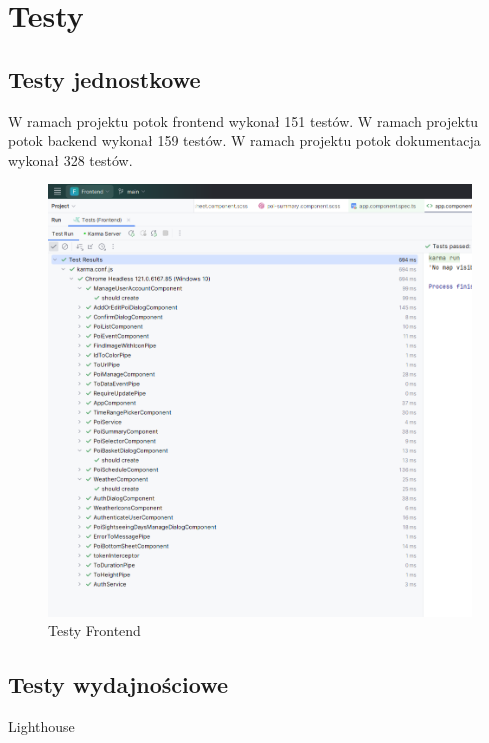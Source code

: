 
\chapter{Testy}
\label{ch:testy}

\section{Testy jednostkowe}
\label{sec:testy-jednostkowe}
W ramach projektu potok frontend wykonał 151 testów. \newline
W ramach projektu potok backend wykonał 159 testów. \newline
W ramach projektu potok dokumentacja wykonał 328 testów. \newline
\begin{figure}[H]
    \centering
    \includegraphics[width=1\textwidth]{attachments/testfrontend}
    \caption{Testy Frontend}
    \label{fig:testfronted}
\end{figure}

\section{Testy wydajnościowe}
\label{sec:testy-wydajnosciowe}
Lighthouse

